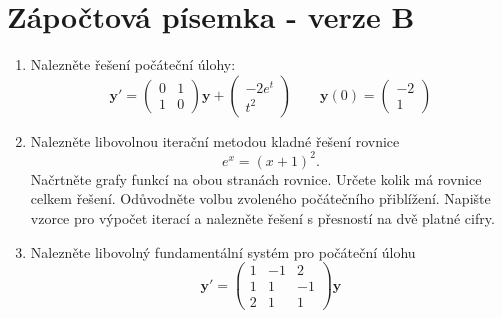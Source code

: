 \documentclass[a4paper,10pt]{article}
\def\vc#1{\mathbf{\boldsymbol{#1}}}     %
\begin{document}
\section*{Zápočtová písemka - verze B}
\begin{enumerate}
 \item 
   Nalezněte řešení počáteční úlohy:
   \[
    \vc y'=\begin{pmatrix}
          0 & 1 \\ 1 & 0
       \end{pmatrix} \vc y
       +
       \begin{pmatrix}
         -2 e^t \\  t^2
       \end{pmatrix}
    \qquad
    \vc y(0)=\begin{pmatrix}
           -2 \\ 1
         \end{pmatrix}
   \]
 \item 
    Nalezněte libovolnou iterační metodou kladné řešení rovnice
    \[
       e^x=(x+1)^2.
    \]
    Načrtněte grafy funkcí na obou stranách rovnice. Určete kolik má rovnice celkem řešení.    Odůvodněte volbu zvoleného počátečního přiblížení. Napište vzorce pro výpočet iterací
    a nalezněte řešení s přesností na dvě platné cifry.
 \item
    Nalezněte libovolný fundamentální systém pro počáteční úlohu
    \[
    \vc y'=\begin{pmatrix}
          1 & -1 & 2 \\ 
          1 & 1 & -1 \\
          2 & 1 & 1
       \end{pmatrix} \vc y   
    \]
\end{enumerate}
\pagebreak
\end{document}
